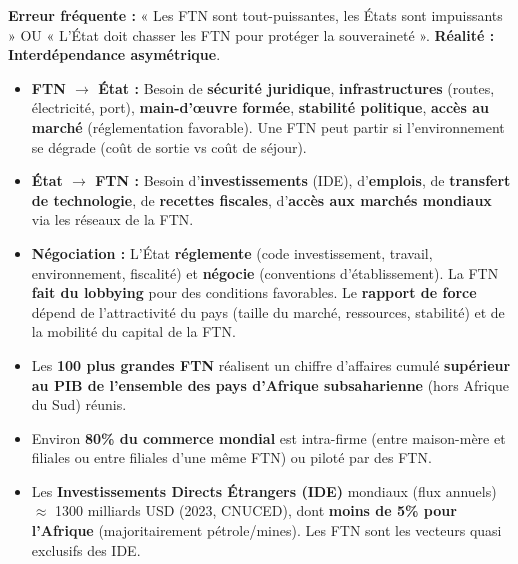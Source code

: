 \documentclass[11pt]{article}
\begin{document}
\begin{attention}
\textbf{Erreur fréquente :} « Les FTN sont tout-puissantes, les États sont impuissants » OU « L'État doit chasser les FTN pour protéger la souveraineté ».
\textbf{Réalité :} \textbf{Interdépendance asymétrique}.
\begin{itemize}
    \item \textbf{FTN $\to$ État :} Besoin de \textbf{sécurité juridique}, \textbf{infrastructures} (routes, électricité, port), \textbf{main-d'œuvre formée}, \textbf{stabilité politique}, \textbf{accès au marché} (réglementation favorable). Une FTN peut partir si l'environnement se dégrade (coût de sortie vs coût de séjour).
    \item \textbf{État $\to$ FTN :} Besoin d'\textbf{investissements} (IDE), d'\textbf{emplois}, de \textbf{transfert de technologie}, de \textbf{recettes fiscales}, d'\textbf{accès aux marchés mondiaux} via les réseaux de la FTN.
    \item \textbf{Négociation :} L'État \textbf{réglemente} (code investissement, travail, environnement, fiscalité) et \textbf{négocie} (conventions d'établissement). La FTN \textbf{fait du lobbying} pour des conditions favorables. Le \textbf{rapport de force} dépend de l'attractivité du pays (taille du marché, ressources, stabilité) et de la mobilité du capital de la FTN.
\end{itemize}
\end{attention}

\begin{aretenir}
\begin{itemize}
    \item Les \textbf{100 plus grandes FTN} réalisent un chiffre d'affaires cumulé \textbf{supérieur au PIB de l'ensemble des pays d'Afrique subsaharienne} (hors Afrique du Sud) réunis.
    \item Environ \textbf{80\% du commerce mondial} est intra-firme (entre maison-mère et filiales ou entre filiales d'une même FTN) ou piloté par des FTN.
    \item Les \textbf{Investissements Directs Étrangers (IDE)} mondiaux (flux annuels) $\approx$ 1300 milliards USD (2023, CNUCED), dont \textbf{moins de 5\% pour l'Afrique} (majoritairement pétrole/mines). Les FTN sont les vecteurs quasi exclusifs des IDE.
\end{itemize}
\end{aretenir}
\end{document}

